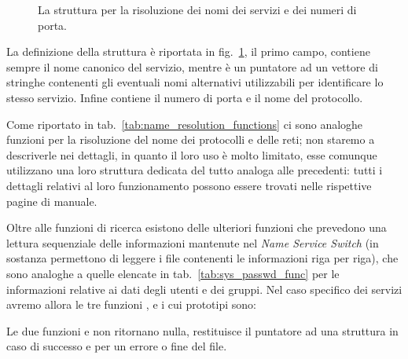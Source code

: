 \begin{figure}[!htb]
  \footnotesize \centering
  \begin{minipage}[c]{0.80\textwidth}
  \end{minipage}
  \caption{La struttura  per la risoluzione dei nomi dei
    servizi e dei numeri di porta.}
  \label{fig:sock_servent_struct}
\end{figure}

La definizione della struttura  è riportata in
fig.~\ref{fig:sock_servent_struct}, il primo campo,  contiene
sempre il nome canonico del servizio, mentre  è un puntatore
ad un vettore di stringhe contenenti gli eventuali nomi alternativi
utilizzabili per identificare lo stesso servizio. Infine 
contiene il numero di porta e  il nome del protocollo.

Come riportato in tab.~\ref{tab:name_resolution_functions} ci sono analoghe
funzioni per la risoluzione del nome dei protocolli e delle reti; non staremo
a descriverle nei dettagli, in quanto il loro uso è molto limitato, esse
comunque utilizzano una loro struttura dedicata del tutto analoga alle
precedenti: tutti i dettagli relativi al loro funzionamento possono essere
trovati nelle rispettive pagine di manuale.

Oltre alle funzioni di ricerca esistono delle ulteriori funzioni che prevedono
una lettura sequenziale delle informazioni mantenute nel \textit{Name Service
  Switch} (in sostanza permettono di leggere i file contenenti le informazioni
riga per riga), che sono analoghe a quelle elencate in
tab.~\ref{tab:sys_passwd_func} per le informazioni relative ai dati degli
utenti e dei gruppi. Nel caso specifico dei servizi avremo allora le tre
funzioni ,  e  i cui
prototipi sono:

\begin{funcproto}{
}

{Le due funzioni  e  non ritornano nulla,
   restituisce il puntatore ad una struttura 
  in caso di successo e  per un errore o fine del file.}
\end{funcproto}

